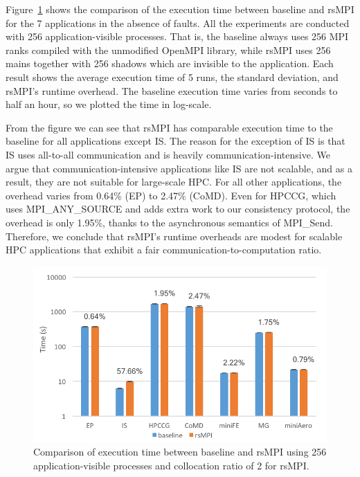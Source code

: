 Figure~\ref{fig:runtime_overhead} shows the comparison of the execution time between baseline and rsMPI for the 7 applications in the absence of faults. All the experiments are conducted with 256 application-visible processes. That is, the baseline always uses 256 MPI ranks compiled with the unmodified OpenMPI library, while rsMPI uses 256 mains together with 256 shadows which are invisible to the application. Each result shows the average execution time of 5 runs, the standard deviation, and rsMPI's runtime overhead. The baseline execution time varies from seconds to half an hour, so we plotted the time in log-scale. 

From the figure we can see that rsMPI has comparable execution time to the baseline for all applications except IS. The reason for the exception of IS is that IS uses all-to-all communication and is heavily communication-intensive. %
We argue that communication-intensive applications like IS are not scalable, and as a result, they are not suitable for large-scale HPC. 
For all other applications, the overhead varies from 0.64\% (EP) to 2.47\% (CoMD). Even for HPCCG, which uses MPI\_ANY\_SOURCE and adds extra work to our consistency protocol, the overhead is only 1.95\%, thanks to the asynchronous semantics of MPI\_Send. Therefore, we conclude that rsMPI's runtime overheads are modest for scalable HPC applications that exhibit a fair communication-to-computation ratio.

\begin{figure}[!t]
  \begin{center}
      \includegraphics[width=\columnwidth]{figures/runtime_overhead}
  \end{center}
  \caption{Comparison of execution time between baseline and rsMPI using 256 application-visible processes and collocation ratio of 2 for rsMPI.}
  \label{fig:runtime_overhead}
  \vspace{-0.1in}
\end{figure}

